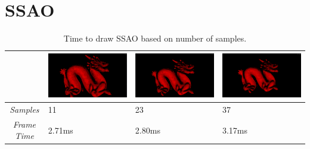 \section{SSAO}

\begin{table}[!ht]
\begin{center}
\begin{tabular}{| c | p{3.5cm} | p{3.5cm} | p{3.5cm} |}
\hline
&
\includegraphics[scale=0.1,trim=0 0 0 -5]{img/results/ssao/11samplesdragon} &
\includegraphics[scale=0.1,trim=0 0 0 -5]{img/results/ssao/23samplesdragon} &
\includegraphics[scale=0.1,trim=0 0 0 -5]{img/results/ssao/37samplesdragon} \\
\hline
\emph{Samples} & 11 & 23 & 37 \\
\hline
\emph{Frame Time} & 2.71ms & 2.80ms & 3.17ms\\
\hline
\end{tabular}
\caption{Time to draw SSAO based on number of samples.}
\label{table-ssao-samples}
\end{center}
\end{table}

